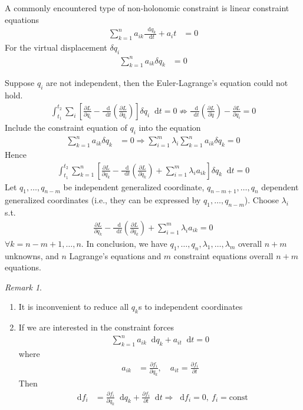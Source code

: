 \documentclass[twoside,11pt]{article}
\numberwithin{equation}{section} %
\newcommand{\lms}{\fontfamily{lmss}\selectfont} %
\renewcommand*\d{\mathop{}\!\mathrm{d}}
\theoremstyle{definition}
\theoremstyle{remark}
\newtheorem*{remark}{\lms Remark}
\begin{document}
A commonly encountered type of non-holonomic constraint is linear constraint equations
\begin{align}
    \sum_{k=1}^n a_{ik}\frac{\d q_k}{\d t} + a_i t &= 0
\end{align}
For the virtual displacement $\delta q_i$
\begin{align}
    \sum_{k=1}^n a_{ik}\delta q_k &= 0
\end{align}

Suppose $q_i$ are not independent, then the Euler-Lagrange's equation
could not hold.
\begin{align*}
    \int_{t_1}^{t_2}\sum_i\left[
        \frac{\partial L}{\partial q_i}
        - \frac{\d}{\d t}\left(\frac{\partial L}{\partial\dot{q}_i}\right)
    \right]\delta q_i\d t = 0 
    \nRightarrow
    \frac{\d}{\d t}\left(\frac{\partial L}{\partial\dot{q}}\right)
    - \frac{\partial L}{\partial q_i} = 0
\end{align*}
Include the constraint equation of $q_i$ into the equation
\begin{align}
    \sum_{k=1}^n a_{ik}\delta q_k &= 0
    \Rightarrow
    \sum_{i=1}^m \lambda_i\sum_{k=1}^n a_{ik}\delta q_k = 0
\end{align}
Hence
\begin{align*}
    \int_{t_1}^{t_2}\sum_{k=1}^n\left[
        \frac{\partial L}{\partial q_k}
        - \frac{\d}{\d t}\left(\frac{\partial L}{\partial\dot{q}_k}\right)
        + \sum_{i=1}^m\lambda_i a_{ik}
    \right]\delta q_k\d t = 0 
\end{align*}
Let $q_1,\dots,q_{n-m}$ be independent generalized coordinate,
$q_{n-m+1},\dots,q_n$ dependent generalized coordinates (i.e., they can
be expressed by $q_1,\dots,q_{n-m}$).
Choose $\lambda_i$ s.t.
\begin{align}
    \frac{\partial L}{\partial q_k}
    - \frac{\d}{\d t}\left(\frac{\partial L}{\partial\dot{q}_k}\right)
    + \sum_{i=1}^m\lambda_i a_{ik}
    = 0
\end{align}
$\forall k = n-m+1,\dots,n$.
In conclusion, we have $q_1,\dots,q_n,\lambda_1,\dots,\lambda_m$ overall
$n+m$ unknowns, and $n$ Lagrange's equations and $m$ constraint equations
overall $n+m$ equations.
\begin{remark}\ 
\begin{enumerate}[label=\arabic*)]
\item It is inconvenient to reduce all $q_k$s to independent 
coordinates
\item If we are interested in the constraint forces
\begin{align*}
    \sum_{k=1}^n a_{ik}\d q_k + a_{it}\d t = 0
\end{align*}
where 
\begin{align*}
    a_{ik} &= \frac{\partial f_i}{\partial q_k},\quad
    a_{it} = \frac{\partial f_i}{\partial t}
\end{align*}
Then
\begin{align*}
    \d f_i &= \frac{\partial f_i}{\partial q_k}\d q_k + 
    \frac{\partial f_i}{\partial t}\d t
    \Rightarrow \d f_i = 0,~f_i=\text{const}
\end{align*}
\end{enumerate}
\end{remark}
\end{document}
